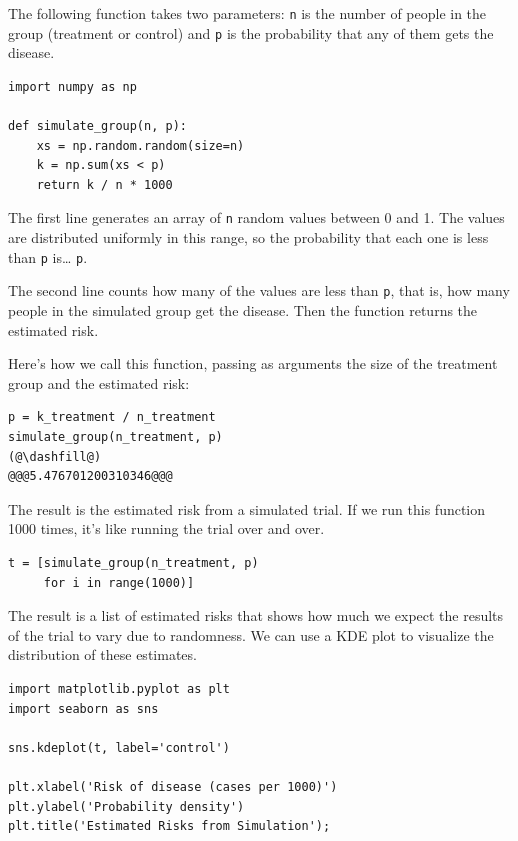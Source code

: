 The following function takes two parameters: \passthrough{\lstinline!n!}
is the number of people in the group (treatment or control) and
\passthrough{\lstinline!p!} is the probability that any of them gets the
disease.

\begin{lstlisting}[]
import numpy as np

def simulate_group(n, p):
    xs = np.random.random(size=n)
    k = np.sum(xs < p)
    return k / n * 1000
\end{lstlisting}

The first line generates an array of \passthrough{\lstinline!n!} random
values between 0 and 1. The values are distributed uniformly in this
range, so the probability that each one is less than
\passthrough{\lstinline!p!} is\ldots{} \passthrough{\lstinline!p!}.

The second line counts how many of the values are less than
\passthrough{\lstinline!p!}, that is, how many people in the simulated
group get the disease. Then the function returns the estimated risk.

Here's how we call this function, passing as arguments the size of the
treatment group and the estimated risk:

\begin{lstlisting}[]
p = k_treatment / n_treatment
simulate_group(n_treatment, p)
(@\dashfill@)
@@@5.476701200310346@@@
\end{lstlisting}

The result is the estimated risk from a simulated trial. If we run this
function 1000 times, it's like running the trial over and over.

\begin{lstlisting}[]
t = [simulate_group(n_treatment, p)
     for i in range(1000)]
\end{lstlisting}

The result is a list of estimated risks that shows how much we expect
the results of the trial to vary due to randomness. We can use a KDE
plot to visualize the distribution of these estimates.

\begin{lstlisting}[]
import matplotlib.pyplot as plt
import seaborn as sns

sns.kdeplot(t, label='control')

plt.xlabel('Risk of disease (cases per 1000)')
plt.ylabel('Probability density')
plt.title('Estimated Risks from Simulation');
\end{lstlisting}


